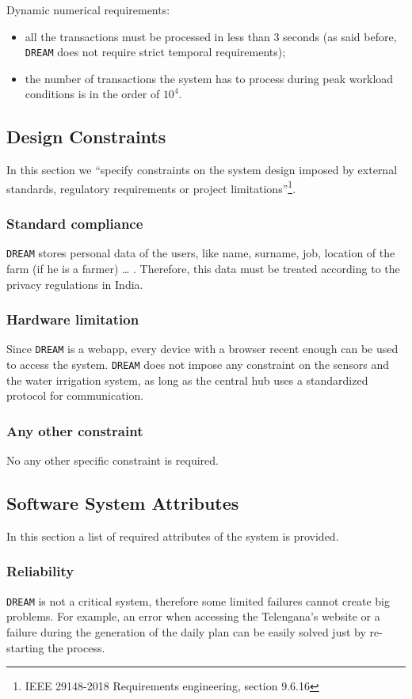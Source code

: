 \documentclass{article}
\begin{document}
Dynamic numerical requirements:
\begin{itemize}
\item all the transactions must be processed in less than 3 seconds (as said before, \verb|DREAM| does not require strict temporal requirements);
\item the number of transactions the system has to process during peak workload conditions is in the order of $10^4$.
\end{itemize}

\subsection{Design Constraints}
In this section we “specify constraints on the system design imposed by external standards, regulatory requirements or project limitations”\footnote{IEEE 29148-2018 Requirements engineering, section 9.6.16}.
\subsubsection{Standard compliance}
\verb|DREAM| stores personal data of the users, like name, surname, job, location of the farm (if he is a farmer) … . Therefore, this data must be treated according to the privacy regulations in India.
\subsubsection{Hardware limitation}
Since \verb|DREAM| is a webapp, every device with a browser recent enough can be used to access the system. \verb|DREAM| does not impose any constraint on the sensors and the water irrigation system, as long as the central hub uses a standardized protocol for communication.
\subsubsection{Any other constraint}
No any other specific constraint is required.
\subsection{Software System Attributes}
In this section a list of required attributes of the system is provided.
\subsubsection{Reliability}
\verb|DREAM| is not a critical system, therefore some limited failures cannot create big problems. For example, an error when accessing the Telengana’s website or a failure during the generation of the daily plan can be easily solved just by re-starting the process.
\end{document}

